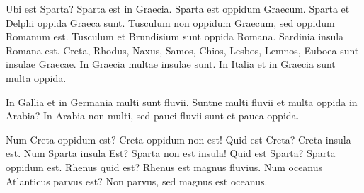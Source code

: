 \documentclass[a4paper]{article}
\begin{document}
Ubi est Sparta? Sparta est in Graecia. Sparta est oppidum Graecum. Sparta et Delphi oppida Graeca sunt. Tusculum non oppidum
Graecum, sed oppidum Romanum est. Tusculum et Brundisium sunt oppida Romana. Sardinia insula Romana est. Creta, Rhodus,
Naxus, Samos, Chios, Lesbos, Lemnos, Euboea sunt insulae Graecae. In Graecia multae insulae sunt. In Italia et in Graecia
sunt multa oppida. 

In Gallia et in Germania multi sunt fluvii. Suntne multi fluvii et multa oppida in Arabia? In Arabia non
multi, sed pauci fluvii sunt et pauca oppida.

Num Creta oppidum est? Creta oppidum non est! Quid est Creta? Creta insula est. Num Sparta insula Est? Sparta non est insula!
Quid est Sparta? Sparta oppidum est. Rhenus quid est? Rhenus est magnus fluvius. Num oceanus Atlanticus parvus est? Non parvus,
sed magnus est oceanus.
\end{document}
